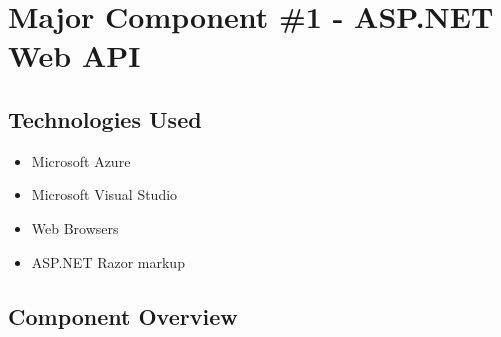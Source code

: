 \pagebreak
\section{Major Component \#1 - ASP.NET Web API}

\subsection{Technologies  Used}
\begin{itemize}
\item Microsoft Azure
\item Microsoft Visual Studio
\item Web Browsers
\item ASP.NET Razor markup
\end{itemize} 

\subsection{Component  Overview}
